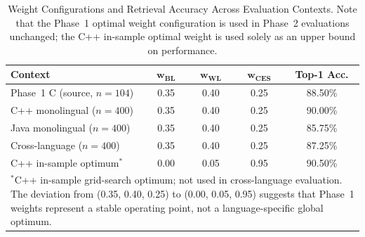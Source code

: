 \begin{table}[ht]
\caption{Weight Configurations and Retrieval Accuracy Across Evaluation Contexts. Note that the Phase~1 optimal weight configuration is used in Phase~2 evaluations unchanged; the C++ in-sample optimal weight is used solely as an upper bound on performance.}
\label{tab:weight_stability}
\centering
\begin{tabular}{|l|c|c|c|c|}
\hline
\textbf{Context} & $\boldsymbol{w_{BL}}$ & $\boldsymbol{w_{WL}}$ & $\boldsymbol{w_{CES}}$ & \textbf{Top-1 Acc.} \\
\hline
Phase~1 C (source, $n=104$) & 0.35 & 0.40 & 0.25 & 88.50\% \\
C++ monolingual ($n=400$)   & 0.35 & 0.40 & 0.25 & 90.00\% \\
Java monolingual ($n=400$)  & 0.35 & 0.40 & 0.25 & 85.75\% \\
Cross-language ($n=400$)    & 0.35 & 0.40 & 0.25 & 87.25\% \\
C++ in-sample optimum$^{*}$ & 0.00 & 0.05 & 0.95 & 90.50\% \\
\hline

\multicolumn{5}{p{8.2cm}}{$^{*}$C++ in-sample grid-search optimum; not used in cross-language evaluation. The deviation from (0.35, 0.40, 0.25) to (0.00, 0.05, 0.95) suggests that Phase~1 weights represent a stable operating point, not a language-specific global optimum.} \\
\end{tabular}
\end{table}

